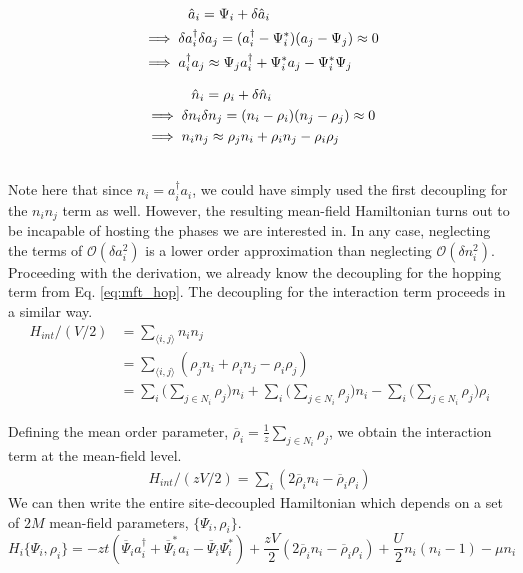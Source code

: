 \begin{minipage}{0.5\linewidth}
    \begin{align}
        &\hspace{1.2cm}\hat{a}_i = \Psi_i + \delta \hat{a}_i \nonumber\\
        &\implies \delta a_i^{\dagger} \delta a_j = (a_i^{\dagger} - \Psi_i^*)(a_j - \Psi_j) \approx 0 \nonumber\\
        &\implies a_i^{\dagger}a_j \approx \Psi_ja_i^{\dagger} + \Psi_i^*a_j - \Psi_i^*\Psi_j \nonumber
    \end{align}
\end{minipage}%
\begin{minipage}{0.5\linewidth}
    \begin{align}
        &\hspace{1.2cm}\hat{n}_i = \rho_i + \delta \hat{n}_i \nonumber\\
        &\implies \delta n_i \delta n_j = (n_i - \rho_i)(n_j - \rho_j) \approx 0 \nonumber\\
        &\implies n_i n_j \approx \rho_j n_i + \rho_i n_j - \rho_i\rho_j
    \end{align}
\end{minipage}
\vspace{0.5cm}\\
Note here that since $n_i = a_i^{\dagger}a_i$, we could have simply used the first decoupling for the $n_i n_j$ term as well. However, the resulting mean-field Hamiltonian turns out to be incapable of hosting the phases we are interested in. In any case, neglecting the terms of $\mathcal{O}(\delta a_i^2)$ is a lower order approximation than neglecting $\mathcal{O}(\delta n_i^2)$.
\vspace{0.5cm}\\
Proceeding with the derivation, we already know the decoupling for the hopping term from Eq. \eqref{eq:mft_hop}. The decoupling for the interaction term proceeds in a similar way. 
\begin{align}
    H_{int}/(V/2) &= \sum_{\langle i, j\rangle} n_i n_j \nonumber\\
    &= \sum_{\langle i, j\rangle} (\rho_jn_i + \rho_in_j - \rho_i\rho_j) \nonumber\\
    &= \sum_i \big (\sum_{j \in N_i} \rho_j\big ) n_i + \sum_i \big (\sum_{j \in N_i} \rho_j\big ) n_i - \sum_i \big (\sum_{j \in N_i} \rho_j\big) \rho_i
\end{align}

Defining the mean order parameter, $\overline{\rho}_i = \frac{1}{z}\sum_{j \in N_i} \rho_j$, we obtain the interaction term at the mean-field level.
\begin{align}
    H_{int}/(zV/2) = \sum_i (2\overline{\rho}_i n_i - \overline{\rho}_i\rho_i)
\end{align}
We can then write the entire site-decoupled Hamiltonian which depends on a set of $2M$
mean-field parameters, $\{\Psi_i, \rho_i\}$.
\begin{equation}
    H_i\{\Psi_i, \rho_i\} = -zt (\overline{\Psi}_i a_i^{\dagger} + \overline{\Psi}_i^* a_i - \overline{\Psi}_i\Psi_i^*) + \frac{zV}{2} (2\overline{\rho}_i n_i - \overline{\rho}_i\rho_i) + \frac{U}{2}n_i(n_i - 1) - \mu n_i
\end{equation}


